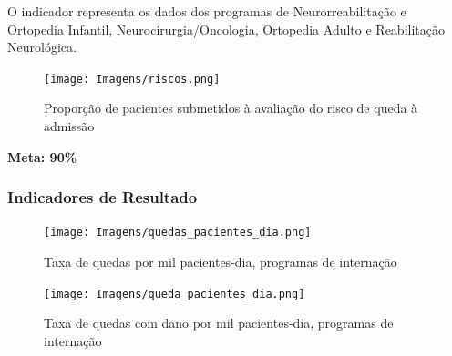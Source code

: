 \documentclass[
  a4paper]{article}
\begin{document}
O indicador representa os dados dos programas de Neurorreabilitação e
Ortopedia Infantil, Neurocirurgia/Oncologia, Ortopedia Adulto e
Reabilitação Neurológica.

\begin{figure}[H]
\caption{Proporção de pacientes submetidos à avaliação do risco de queda à admissão}
\texttt{[image: Imagens/riscos.png]}
\end{figure}

\begin{center}
 \textbf{Meta: 90\%}
\end{center}

\subsubsection{Indicadores de Resultado}

\begin{figure}[H]
\caption{Taxa de quedas por mil pacientes-dia, programas de internação}
\texttt{[image: Imagens/quedas\_pacientes\_dia.png]}
\end{figure}

\begin{figure}[H]
\caption{Taxa de quedas com dano por mil pacientes-dia, programas de internação}
\texttt{[image: Imagens/queda\_pacientes\_dia.png]}
\end{figure}

\begin{table}[H]

\caption{\label{tab:unnamed-chunk-24}Distribuição do número de quedas, programas de internação}
\centering
{}
\end{table}
\end{document}
